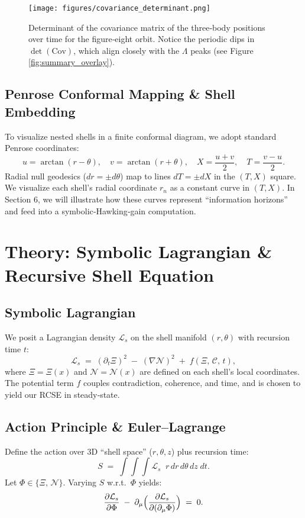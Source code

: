 \documentclass[11pt]{article}
\newcommand{\Contradiction}{\Xi}
\newcommand{\Coherence}{\mathcal{C}}
\newcommand{\Noetic}{\mathcal{N}}
\newcommand{\Leak}{\Lambda}
\newcommand{\Lag}{\mathcal{L}_s}
\begin{document}
\begin{figure}[H]
  \centering
  \texttt{[image: figures/covariance\_determinant.png]}
  \caption{Determinant of the covariance matrix of the three‐body positions over time for the figure‐eight orbit. Notice the periodic dips in \(\det(\mathrm{Cov})\), which align closely with the \(\Leak\) peaks (see Figure \ref{fig:summary_overlay}).}
  \label{fig:covariance_determinant}
\end{figure}

\subsection{Penrose Conformal Mapping \& Shell Embedding}
To visualize nested shells in a finite conformal diagram, we adopt standard Penrose coordinates:
\[
  u = \arctan(r - \theta),\quad
  v = \arctan(r + \theta),\quad
  X = \frac{u + v}{2},\quad
  T = \frac{v - u}{2}.
\]
Radial null geodesics (\(dr = \pm d\theta\)) map to lines \(dT = \pm dX\) in the \((T,X)\) square. We visualize each shell’s radial coordinate \(r_n\) as a constant curve in \((T,X)\). In Section 6, we will illustrate how these curves represent “information horizons” and feed into a symbolic‐Hawking‐gain computation.

\section{Theory: Symbolic Lagrangian \& Recursive Shell Equation}

\subsection{Symbolic Lagrangian}
We posit a Lagrangian density \(\Lag\) on the shell manifold \((r,\theta)\) with recursion time \(t\):
\[
  \Lag \;=\; (\partial_t \Contradiction)^2 \;-\; (\nabla \Noetic)^2 \;+\; f(\Contradiction,\,\Coherence,\,t),
\]
where \(\Contradiction = \Contradiction(x)\) and \(\Noetic = \Noetic(x)\) are defined on each shell’s local coordinates. The potential term \(f\) couples contradiction, coherence, and time, and is chosen to yield our RCSE in steady‐state.

\subsection{Action Principle \& Euler–Lagrange}
Define the action over 3D “shell space” (\(r,\theta,z\)) plus recursion time:
\[
  S \;=\; \int \!\!\int \!\!\int \Lag \;\; r\,dr\,d\theta\,dz \;dt.
\]
Let \(\Phi\in\{\Contradiction,\,\Noetic\}\). Varying \(S\) w.r.t.\ \(\Phi\) yields:
\[
  \frac{\partial \Lag}{\partial \Phi}
  \;-\;\partial_{\mu}\Bigl(\frac{\partial \Lag}{\partial(\partial_{\mu}\Phi)}\Bigr)
  \;=\; 0.
\]
\end{document}
